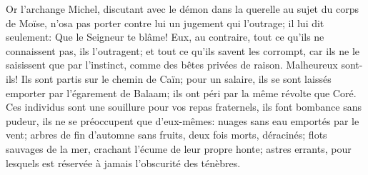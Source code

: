 Or l’archange Michel,
	discutant avec le démon dans la querelle au sujet du corps de Moïse,
	n’osa pas porter contre lui un jugement qui l’outrage;
	il lui dit seulement: Que le Seigneur te blâme!
Eux, au contraire, tout ce qu’ils ne connaissent pas, ils l’outragent;
	et tout ce qu’ils savent les corrompt,
	car ils ne le saisissent que par l’instinct,
	comme des bêtes privées de raison.
Malheureux sont-ils! Ils sont partis sur le chemin de Caïn;
	pour un salaire, ils se sont laissés emporter par l’égarement de Balaam;
	ils ont péri par la même révolte que Coré.
Ces individus sont une souillure pour vos repas fraternels,
	ils font bombance sans pudeur, ils ne se préoccupent que d’eux-mêmes:
	nuages sans eau emportés par le vent;
	arbres de fin d’automne sans fruits, deux fois morts, déracinés;
	flots sauvages de la mer, crachant l’écume de leur propre honte;
	astres errants,
		pour lesquels est réservée à jamais l’obscurité des ténèbres.
